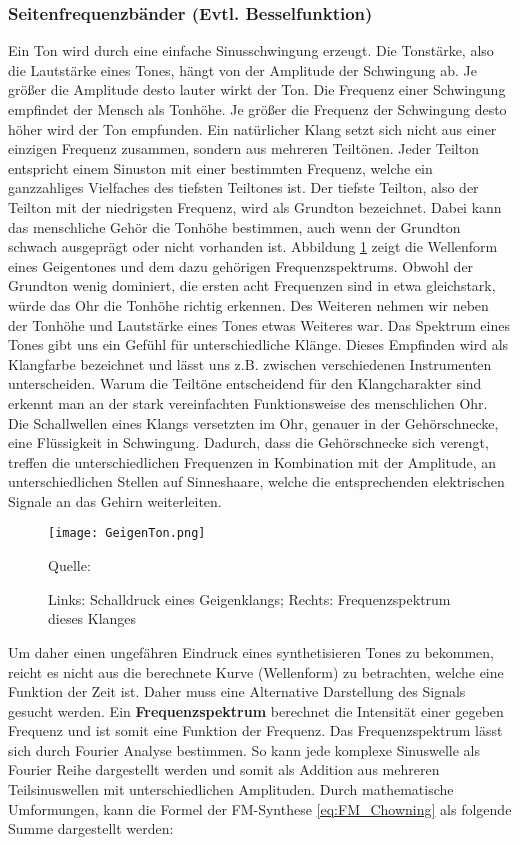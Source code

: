 \subsubsection{Seitenfrequenzbänder (Evtl. Besselfunktion)}
\label{bulli:ohrToeneUndFrequenzen}
Ein Ton wird durch eine einfache Sinusschwingung erzeugt. Die Tonstärke, also die Lautstärke eines Tones, hängt von der Amplitude der Schwingung ab. Je größer die Amplitude desto lauter wirkt der Ton. Die Frequenz einer Schwingung empfindet der Mensch als Tonhöhe. Je größer die Frequenz der Schwingung desto höher wird der Ton empfunden. 
Ein natürlicher Klang setzt sich nicht aus einer einzigen Frequenz zusammen, sondern aus mehreren Teiltönen. Jeder Teilton entspricht einem Sinuston mit einer bestimmten Frequenz, welche ein ganzzahliges Vielfaches des tiefsten Teiltones ist. Der tiefste Teilton, also der Teilton mit der niedrigsten Frequenz, wird als Grundton bezeichnet. \cite[S. 87]{borucki} 
Dabei kann das menschliche Gehör die Tonhöhe bestimmen, auch wenn der Grundton schwach ausgeprägt oder nicht vorhanden ist. \cite[S. 4]{zwicker} Abbildung \ref{fig:geige} zeigt die Wellenform eines Geigentones und dem dazu gehörigen Frequenzspektrums. Obwohl der Grundton wenig dominiert, die ersten acht Frequenzen sind in etwa gleichstark, würde das Ohr die Tonhöhe richtig erkennen. Des Weiteren nehmen wir neben der Tonhöhe und Lautstärke eines Tones etwas Weiteres war. Das Spektrum eines Tones gibt uns ein Gefühl für unterschiedliche Klänge. Dieses Empfinden wird als Klangfarbe bezeichnet und lässt uns z.B. zwischen verschiedenen Instrumenten unterscheiden. \cite[S. 5]{zwicker} \cite[S. 226]{raichel}
Warum die Teiltöne entscheidend für den Klangcharakter sind erkennt man an der stark vereinfachten Funktionsweise des menschlichen Ohr. Die Schallwellen eines Klangs versetzten im Ohr, genauer in der Gehörschnecke, eine Flüssigkeit in Schwingung. Dadurch, dass die Gehörschnecke sich verengt, treffen die unterschiedlichen Frequenzen in Kombination mit der Amplitude, an unterschiedlichen Stellen auf Sinneshaare, welche die entsprechenden elektrischen Signale an das Gehirn weiterleiten. \cite[S. 87 f.]{zwicker}
\begin{figure} [ht]
\centering
  \texttt{[image: GeigenTon.png]}
\caption{Links: Schalldruck eines Geigenklangs; Rechts: Frequenzspektrum dieses Klanges}
\label{fig:geige}
Quelle: \cite[S. 4]{zwicker}
\end{figure}
\FloatBarrier

Um daher einen ungefähren Eindruck eines synthetisieren Tones zu bekommen, reicht es nicht aus die berechnete Kurve (Wellenform) zu betrachten, welche eine Funktion der Zeit ist. Daher muss eine Alternative Darstellung des Signals gesucht werden. Ein \textbf{Frequenzspektrum} berechnet die Intensität einer gegeben Frequenz und ist somit eine Funktion der Frequenz. Das Frequenzspektrum lässt sich durch Fourier Analyse bestimmen. So kann jede komplexe Sinuswelle als Fourier Reihe dargestellt werden und somit als Addition aus mehreren Teilsinuswellen mit unterschiedlichen Amplituden. \cite[S. 33]{raichel} Durch mathematische Umformungen, kann die Formel der FM-Synthese \ref{eq:FM_Chowning} als folgende Summe dargestellt werden: \cite{chowningPaper}

